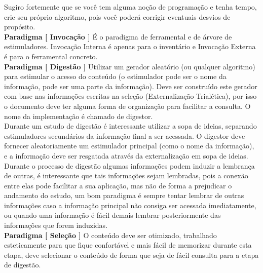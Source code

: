 \documentclass[10pt,a4paper]{report}
\begin{document}
Sugiro fortemente que se você tem alguma noção de programação e tenha tempo, crie seu próprio algoritmo, pois você poderá corrigir eventuais desvios de propósito. \\

\textbf{Paradigma [ Invocação ]} É o paradigma de ferramental e de árvore de estimuladores. Invocação Interna é apenas para o inventário e Invocação Externa é para o ferramental concreto. \\

\textbf{Paradigma [ Digestão ]} Utilizar um gerador aleatório (ou qualquer algoritmo) para estimular o acesso do conteúdo (o estimulador pode ser o nome da informação, pode ser uma parte da informação). Deve ser construído este gerador com base nas informações escritas na seleção (Externalização Trialética), por isso o documento deve ter alguma forma de organização para facilitar a consulta. O nome da implementação é chamado de digestor. \\

Durante um estudo de digestão é interessante utilizar a sopa de ideias, separando estimuladores secundários da informação final a ser acessada. O digestor deve fornecer aleatoriamente um estimulador principal (como o nome da informação), e a informação deve ser resgatada através da externalização em sopa de ideias. \\

Durante o processo de digestão algumas informações podem induzir a lembrança de outras, é interessante que tais informações sejam lembradas, pois a conexão entre elas pode facilitar a sua aplicação, mas não de forma a prejudicar o andamento do estudo, um bom paradigma é sempre tentar lembrar de outras informações caso a informação principal não consiga ser acessada imediatamente, ou quando uma informação é fácil demais lembrar posteriormente das informações que forem induzidas.\\


\textbf{Paradigma [ Seleção ]} O conteúdo deve ser otimizado, trabalhado esteticamente para que fique confortável e mais fácil de memorizar durante esta etapa, deve selecionar o conteúdo de forma que seja de fácil consulta para a etapa de digestão.\\
\end{document}
